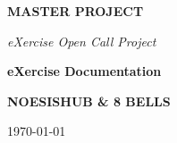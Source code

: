 \thispagestyle{empty}
\begin{center}
\vspace*{4cm}

{\Huge \textbf{MASTER PROJECT}}

\vspace{0.5cm}

{\Large \textit{eXercise Open Call Project}}

\vspace{2cm}

{\LARGE \textbf{eXercise Documentation}}

\vspace{1cm}

\Large \textbf{NOESISHUB \& 8 BELLS}

\vspace{2cm}

\large \today

\end{center}

\newpage